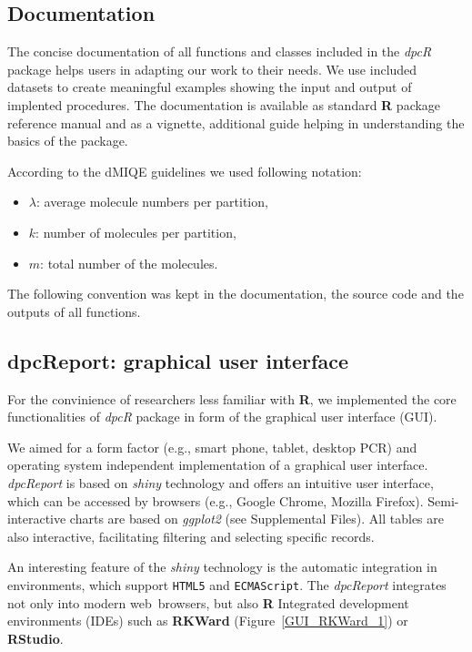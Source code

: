 \documentclass[a4,center,fleqn]{NAR}
\begin{document}
\subsection{Documentation}

The concise documentation of all functions and classes included in the 
\textit{dpcR} package helps users in adapting our work to their needs. We use 
included datasets to create meaningful examples showing the input and output of 
implented procedures. The documentation is available as standard \textbf{R} 
package reference manual and as a vignette, additional guide helping in 
understanding the basics of the package.

According to the dMIQE guidelines \cite{huggett_digital_2013} we used following 
notation:
\begin{itemize}
 \item $\lambda$: average molecule numbers per partition,
 \item $k$: number of molecules per partition,
 \item $m$: total number of the molecules.
\end{itemize}

The following convention was kept in the documentation, the source code and the 
outputs of all functions.


\subsection{dpcReport: graphical user interface}

For the convinience of researchers less familiar with \textbf{R}, we 
implemented the core functionalities of \textit{dpcR} package in form of 
the graphical user interface (GUI).

We aimed for a form factor (e.g., smart phone, tablet, desktop PCR) and 
operating system independent implementation of a graphical user interface. 
\textit{dpcReport} is based on \textit{shiny} technology and offers an intuitive 
user interface, which can be accessed by browsers (e.g., Google Chrome, Mozilla 
Firefox). Semi-interactive charts are based on \textit{ggplot2} (see 
Supplemental Files). All tables are also interactive, facilitating filtering 
and selecting specific records.

An interesting feature of the \textit{shiny} technology is the automatic 
integration in environments, which support \texttt{HTML5} and 
\texttt{ECMAScript}. The \textit{dpcReport} integrates not only into modern 
web~browsers, but also \textbf{R} Integrated development environments (IDEs) 
such as \textbf{RKWard} (Figure~\ref{GUI_RKWard_1}) \cite{rodiger_rkward_2012} 
or \textbf{RStudio}.
\end{document}
